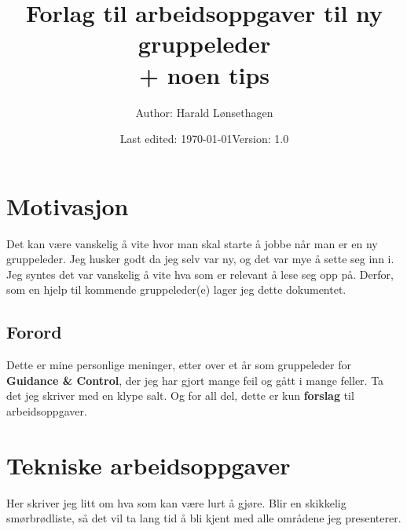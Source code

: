 



\title{\textbf{Forlag til arbeidsoppgaver til ny gruppeleder \\+ noen tips}}
\author{Author: Harald Lønsethagen}
\date{Last edited: \today\tab Version: 1.0}

\maketitle


\makeatletter
\tableofcontents
\newpage
\section{Motivasjon}
Det kan være vanskelig å vite hvor man skal starte å jobbe når man er en ny gruppeleder. Jeg husker godt da jeg selv var ny, og det var mye å sette seg inn i. Jeg syntes det var vanskelig å vite hva som er relevant å lese seg opp på. Derfor, som en hjelp til kommende gruppeleder(e) lager jeg dette dokumentet. 
\subsection*{Forord}
Dette er mine personlige meninger, etter over et år som gruppeleder for \textbf{Guidance \& Control}, der jeg har gjort mange feil og gått i mange feller. Ta det jeg skriver med en klype salt. Og for all del, dette er kun \textbf{forslag} til arbeidsoppgaver.

\section{Tekniske arbeidsoppgaver}
Her skriver jeg litt om hva som kan være lurt å gjøre. Blir en skikkelig smørbrødliste, så det vil ta lang tid å bli kjent med alle områdene jeg presenterer.


